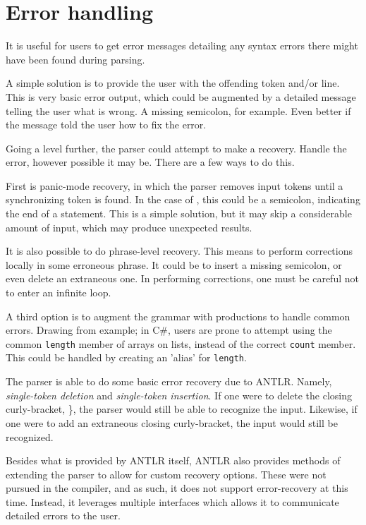 \section{Error handling}
It is useful for users to get error messages detailing any syntax errors there might have been found during parsing.

A simple solution is to provide the user with the offending token and/or line. This is very basic error output, which could be augmented by a detailed message telling the user what is wrong. A missing semicolon, for example. Even better if the message told the user how to fix the error. 

Going a level further, the parser could attempt to make a recovery. Handle the error, however possible it may be. There are a few ways to do this.

First is panic-mode recovery, in which the parser removes input tokens until a synchronizing token is found. In the case of \dazel{}, this could be a semicolon, indicating the end of a statement. This is a simple solution, but it may skip a considerable amount of input, which may produce unexpected results\cite{crafting_a_compiler}.

It is also possible to do phrase-level recovery. This means to perform corrections locally in some erroneous phrase. It could be to insert a missing semicolon, or even delete an extraneous one. In performing corrections, one must be careful not to enter an infinite loop\cite{spo_course}.

A third option is to augment the grammar with productions to handle common errors\cite{spo_course}. Drawing from example; in C\#, users are prone to attempt using the common \texttt{length} member of arrays on lists, instead of the correct \texttt{count} member. This could be handled by creating an 'alias' for \texttt{length}.

The \dazel{} parser is able to do some basic error recovery due to ANTLR. Namely, \textit{single-token deletion} and \textit{single-token insertion}. If one were to delete the closing curly-bracket, \}, the parser would still be able to recognize the input. Likewise, if one were to add an extraneous closing curly-bracket, the input would still be recognized.

Besides what is provided by ANTLR itself, ANTLR also provides methods of extending the parser to allow for custom recovery options. These were not pursued in the \dazel{} compiler, and as such, it does not support error-recovery at this time. Instead, it leverages multiple interfaces which allows it to communicate detailed errors to the user.

